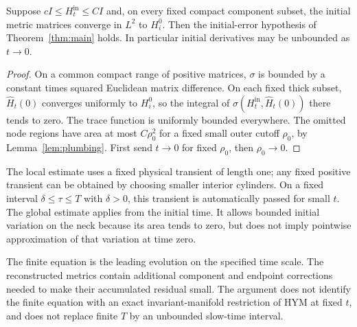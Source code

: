 \begin{corollary}\label{cor:initial-components}
Suppose $cI\le H_t^{\mathrm{in}}\le CI$ and, on every fixed compact
component subset, the initial metric matrices converge in $L^2$ to
$H_i^0$. Then the initial-error hypothesis of Theorem~\ref{thm:main}
holds. In particular initial derivatives may be unbounded as $t\to0$.
\end{corollary}
\begin{proof}
On a common compact range of positive matrices, $\sigma$ is bounded
by a constant times squared Euclidean matrix difference. On each
fixed thick subset, $\widehat H_t(0)$ converges uniformly to $H_i^0$,
so the integral of $\sigma(H_t^{\mathrm{in}},\widehat H_t(0))$ there
tends to zero. The trace function is uniformly bounded everywhere.
The omitted node regions have area at most $C\rho_0^2$ for a fixed
small outer cutoff $\rho_0$, by Lemma~\ref{lem:plumbing}.
First send $t\to0$ for fixed $\rho_0$, then $\rho_0\to0$.
\end{proof}

The local estimate uses a fixed physical transient of length one;
any fixed positive transient can be obtained by choosing smaller
interior cylinders. On a fixed interval $\delta\le\tau\le T$ with
$\delta>0$, this transient is automatically passed for small $t$.
The global estimate applies from the initial time. It allows bounded
initial variation on the neck because its area tends to zero, but
does not imply pointwise approximation of that variation at time zero.

The finite equation is the leading evolution on the specified time
scale. The reconstructed metrics contain additional component and
endpoint corrections needed to make their accumulated residual small.
The argument does not identify the finite equation with an exact
invariant-manifold restriction of HYM at fixed $t$, and does not
replace finite $T$ by an unbounded slow-time interval.

